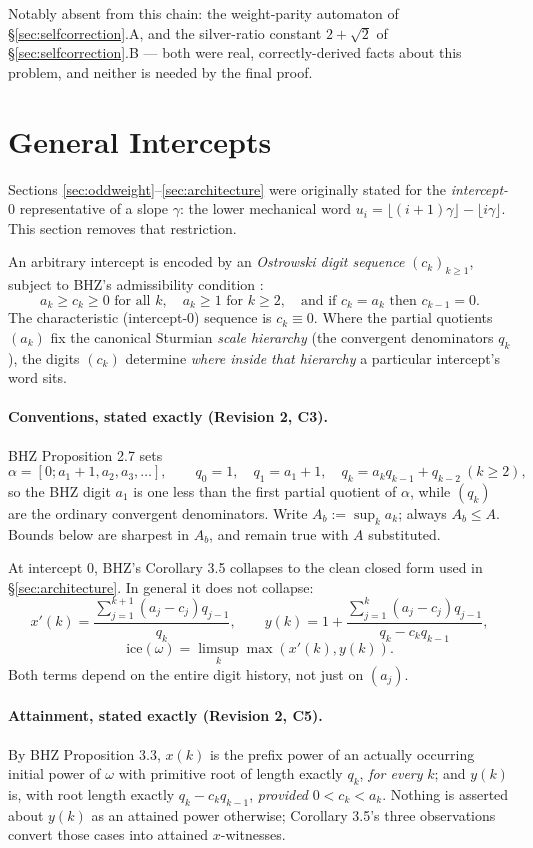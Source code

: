 \documentclass[11pt]{article}
\begin{document}
Notably absent from this chain: the weight-parity automaton of \S\ref{sec:selfcorrection}.A, and the silver-ratio constant $2+\sqrt2$ of \S\ref{sec:selfcorrection}.B --- both were real, correctly-derived facts about this problem, and neither is needed by the final proof.

\section{General Intercepts}
\label{sec:generalintercept}

Sections \ref{sec:oddweight}--\ref{sec:architecture} were originally stated for the
\emph{intercept-$0$} representative of a slope $\gamma$: the lower mechanical word
$u_i=\lfloor(i+1)\gamma\rfloor-\lfloor i\gamma\rfloor$. This section removes that restriction.

An arbitrary intercept is encoded by an \emph{Ostrowski digit sequence} $(c_k)_{k\ge1}$, subject to
BHZ's admissibility condition \cite{BHZ2006}:
\[
a_k \ge c_k \ge 0 \text{ for all } k,\quad a_k\ge1 \text{ for } k\ge2,\quad \text{and if } c_k=a_k \text{ then } c_{k-1}=0.
\]
The characteristic (intercept-$0$) sequence is $c_k\equiv0$. Where the partial quotients $(a_k)$ fix
the canonical Sturmian \emph{scale hierarchy} (the convergent denominators $q_k$), the digits
$(c_k)$ determine \emph{where inside that hierarchy} a particular intercept's word sits.

\paragraph{Conventions, stated exactly (Revision 2, C3).} BHZ Proposition 2.7 sets
\[
\alpha=[0;a_1+1,a_2,a_3,\dots],\qquad q_0=1,\quad q_1=a_1+1,\quad q_k=a_kq_{k-1}+q_{k-2}\ (k\ge2),
\]
so the BHZ digit $a_1$ is one less than the first partial quotient of $\alpha$, while $(q_k)$ are
the ordinary convergent denominators. Write $A_b:=\sup_k a_k$; always $A_b\le A$. Bounds below are
sharpest in $A_b$, and remain true with $A$ substituted.

At intercept $0$, BHZ's Corollary 3.5 collapses to the clean closed form used in
\S\ref{sec:architecture}. In general it does not collapse:
\[
x'(k) = \frac{\sum_{j=1}^{k+1}(a_j-c_j)q_{j-1}}{q_k}, \qquad
y(k) = 1 + \frac{\sum_{j=1}^{k}(a_j-c_j)q_{j-1}}{q_k-c_kq_{k-1}},
\]
\[
\text{ice}(\omega)=\limsup_k \max(x'(k),y(k)).
\]
Both terms depend on the entire digit history, not just on $(a_j)$.

\paragraph{Attainment, stated exactly (Revision 2, C5).} By BHZ Proposition 3.3, $x(k)$ is the
prefix power of an actually occurring initial power of $\omega$ with primitive root of length
exactly $q_k$, \emph{for every} $k$; and $y(k)$ is, with root length exactly $q_k-c_kq_{k-1}$,
\emph{provided} $0<c_k<a_k$. Nothing is asserted about $y(k)$ as an attained power otherwise;
Corollary 3.5's three observations convert those cases into attained $x$-witnesses.
\end{document}
